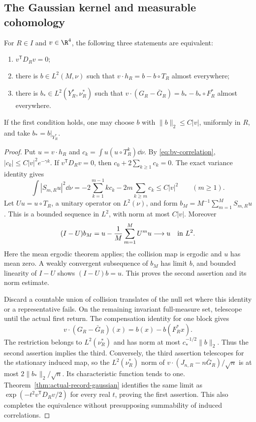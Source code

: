 \subsection{The Gaussian kernel and measurable cohomology}
\begin{theorem}
\label{thm:gaussian-kernel-coboundary}
For $R\in I$ and $v\in\R^4$, the following three statements are
equivalent:
\begin{enumerate}
\item $v^{\mathsf T}D_Rv=0$;
\item there is $b\in L^2(M,\nu)$ such that
 $v\cdot h_R=b-b\circ T_R$ almost everywhere;
\item there is $b_*\in L^2(Y_R^*,\nu_R^*)$ such that
 $v\cdot(G_R-\bar G_R)=b_*-b_*\circ F_R^*$ almost everywhere.
\end{enumerate}
If the first condition holds, one may choose $b$ with
$\|b\|_2\le C|v|$, uniformly in $R$, and take $b_*=b|_{Y_R^*}$.
\end{theorem}
\begin{proof}
Put $u=v\cdot h_R$ and $c_k=\int u(u\circ T_R^k)\dd\nu$.
By \eqref{eq:bv-correlation}, $|c_k|\le C|v|^2e^{-\gamma k}$.
If $v^{\mathsf T}D_Rv=0$, then $c_0+2\sum_{k\ge1}c_k=0$.
The exact variance identity gives
\[
 \int|S_{m,R}u|^2\dd\nu
       =-2\sum_{k=1}^{m-1}k c_k-2m\sum_{k\ge m}c_k
       \le C|v|^2 \qquad(m\ge1).
\]
Let $Uu=u\circ T_R$, a unitary operator on $L^2(\nu)$, and form
$b_M=M^{-1}\sum_{m=1}^M S_{m,R}u$. This is a bounded sequence in
$L^2$, with norm at most $C|v|$. Moreover
\[
 (I-U)b_M=u-\frac1M\sum_{m=1}^M U^m u\longrightarrow u
       \quad\hbox{in }L^2.
\]
Here the mean ergodic theorem applies; the collision map is ergodic
and $u$ has mean zero. A weakly convergent subsequence of $b_M$ has
limit $b$, and bounded linearity of $I-U$ shows $(I-U)b=u$.
This proves the second assertion and its norm estimate.

Discard a countable union of collision translates of the null set
where this identity or a representative fails. On the remaining
invariant full-measure set, telescope until the actual first return.
The compensation identity for one block gives
\[
 v\cdot(G_R-\bar G_R)(x)=b(x)-b(F_R^*x).
\]
The restriction belongs to $L^2(\nu_R^*)$ and has norm at most
$c_*^{-1/2}\|b\|_2$. Thus the second assertion implies the third.
Conversely, the third assertion telescopes for the stationary induced
map, so the $L^2(\nu_R^*)$ norm of
$v\cdot(J_{n,R}-n\bar G_R)/\sqrt n$ is at most
$2\|b_*\|_2/\sqrt n$. Its characteristic function tends to one.
Theorem~\ref{thm:actual-record-gaussian} identifies the same limit as
$\exp(-t^2v^{\mathsf T}D_Rv/2)$ for every real $t$, proving the first
assertion. This also completes the equivalence without presupposing
summability of induced correlations.
\end{proof}

